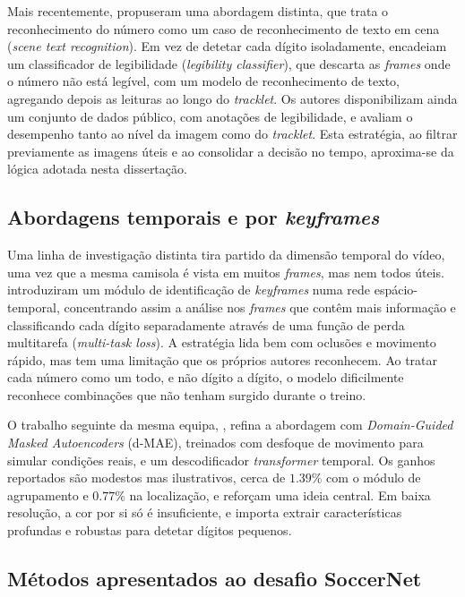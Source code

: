 Mais recentemente, \citet{koshkina2024general} propuseram uma abordagem distinta, que
trata o reconhecimento do número como um caso de reconhecimento de texto em cena
(\emph{scene text recognition}). Em vez de detetar cada dígito isoladamente, encadeiam
um classificador de legibilidade (\emph{legibility classifier}), que descarta as
\emph{frames} onde o número não está legível, com um modelo de reconhecimento de texto,
agregando depois as leituras ao longo do \emph{tracklet}. Os autores disponibilizam ainda
um conjunto de dados público, com anotações de legibilidade, e avaliam o desempenho tanto
ao nível da imagem como do \emph{tracklet}. Esta estratégia, ao filtrar previamente as
imagens úteis e ao consolidar a decisão no tempo, aproxima-se da lógica adotada nesta
dissertação.

\subsection{Abordagens temporais e por \emph{keyframes}}

Uma linha de investigação distinta tira partido da dimensão temporal do vídeo, uma vez que
a mesma camisola é vista em muitos \emph{frames}, mas nem todos úteis.
\citet{balaji2023jersey} introduziram um módulo de identificação de \emph{keyframes} numa
rede espácio-temporal, concentrando assim a análise nos \emph{frames} que contêm mais
informação e classificando cada dígito separadamente através de uma função de perda
multitarefa (\emph{multi-task loss}). A estratégia lida bem com oclusões e movimento
rápido, mas tem uma limitação que os próprios autores reconhecem. Ao tratar cada número
como um todo, e não dígito a dígito, o modelo dificilmente reconhece combinações que não
tenham surgido durante o treino.

O trabalho seguinte da mesma equipa, \citet{balaji2024dmae}, refina a abordagem com
\emph{Domain-Guided Masked Autoencoders} (d-MAE), treinados com desfoque de movimento
para simular condições reais, e um descodificador \emph{transformer} temporal. Os ganhos
reportados são modestos mas ilustrativos, cerca de $1{.}39\%$ com o módulo de agrupamento
e $0{.}77\%$ na localização, e reforçam uma ideia central. Em baixa resolução, a cor por
si só é insuficiente, e importa extrair características profundas e robustas para detetar
dígitos pequenos.

\subsection{Métodos apresentados ao desafio SoccerNet}\label{sec:jnr-desafio}

